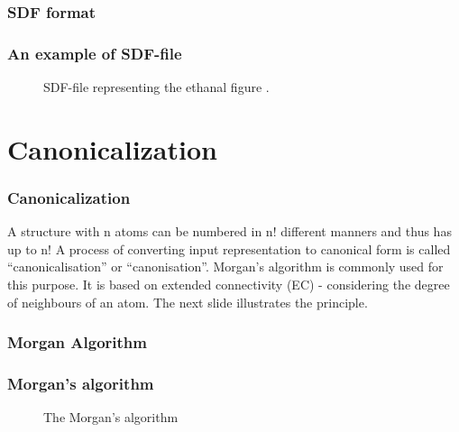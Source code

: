 \documentclass{beamer}
\begin{document}
\subsubsection{SDF format}
\begin{frame}
\frametitle{An example of SDF-file}
\begin{figure}[h!]
\caption{SDF-file representing the ethanal {figure} \cite{gasteiger2006chemoinformatics}.}
\end{figure}
\end{frame}
\section{Canonicalization}
\begin{frame}
\frametitle{Canonicalization}
A structure with n atoms can be numbered in n! different manners and thus has up to n! A process of converting input representation to canonical form is called “canonicalisation” or “canonisation”. Morgan’s algorithm is commonly used for this purpose. It is based on extended connectivity (EC) - considering the degree of neighbours of an atom. The next slide illustrates the principle.
\end{frame}

\subsubsection{Morgan Algorithm}
\begin{frame}
\frametitle{Morgan's algorithm}

\begin{figure}[h!]
\caption{The Morgan's algorithm}
\end{figure}
\end{frame}
\end{document}
